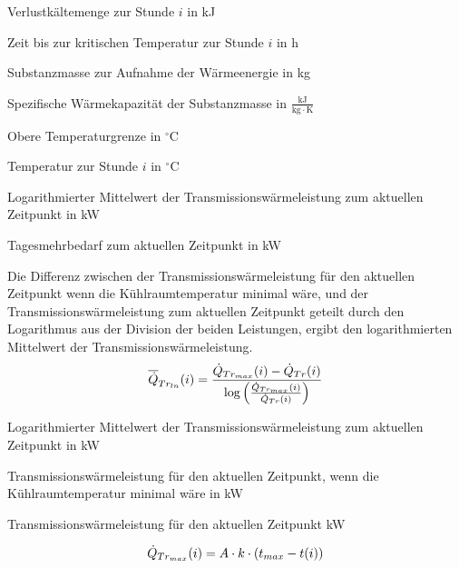 \begin{description}[\dth]
	\item[$Q_{v_{ln}}(i)$] Verlustk\"altemenge zur Stunde $i$ in kJ
	\item[$\tau_{krit}(i)$] Zeit bis zur kritischen Temperatur zur Stunde
	$i$ in h
	\item[$m$] Substanzmasse zur Aufnahme der Wärmeenergie in kg
	\item[$c$] Spezifische Wärmekapazität der Substanzmasse in $\mathrm{\frac{kJ}{kg
		\cdot K}}$
	\item[$t_{max}$] Obere Temperaturgrenze in $ ^{\circ} $C
	\item[$t(i)$] Temperatur zur Stunde $i$ in $ ^{\circ} $C
	\item[$\aptranslog(i)$] Logarithmierter Mittelwert der
		Transmissionswärmeleistung zum aktuellen Zeitpunkt in kW
	\item[$\pmehr(i)$] Tagesmehrbedarf zum aktuellen Zeitpunkt in kW
\end{description}
\vspace{0.5cm}
Die Differenz zwischen der Transmissionswärmeleistung f\"ur den aktuellen
Zeitpunkt wenn die K\"uhlraumtemperatur minimal w\"are, und der
Transmissionswärmeleistung zum aktuellen Zeitpunkt geteilt durch den Logarithmus
aus der Division der beiden Leistungen, ergibt den logarithmierten Mittelwert
der Transmissionswärmeleistung.
\begin{equation}
	\aptranslog(i) = \frac{ \ptransm(i) - \ptrans(i) }{\log \left(
		\frac{\ptransm(i)}{\ptrans(i)} \right)}
	\label{log}
\end{equation}

\begin{description}[\dth]
	\item[$\aptranslog(i)$] Logarithmierter Mittelwert der
		Transmissionswärmeleistung zum aktuellen Zeitpunkt in kW
	\item[$\ptransm(i)$] Transmissionswärmeleistung f\"ur den aktuellen
	Zeitpunkt, wenn die K\"uhlraumtemperatur minimal w\"are in kW
	\item[$\ptrans(i)$] Transmissionswärmeleistung f\"ur den aktuellen
	Zeitpunkt  kW
\end{description}
\vspace{0.5cm}

\begin{equation}
	\ptransm(i) = A \cdot k \cdot \left( t_{max} -
	t(i) \right)
	\label{ptransmi}
\end{equation}

